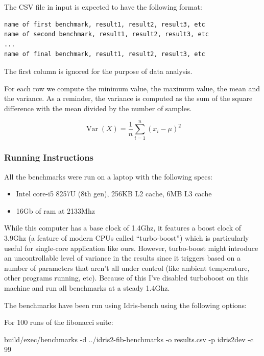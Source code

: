 \documentclass[
]{article}
\newenvironment{Shaded}{}{}
\newcommand{\DecValTok}[1]{\textcolor[rgb]{0.25,0.63,0.44}{#1}}
\newcommand{\NormalTok}[1]{#1}
\newcommand{\OperatorTok}[1]{\textcolor[rgb]{0.40,0.40,0.40}{#1}}
\providecommand{\tightlist}{%
  \setlength{\itemsep}{0pt}\setlength{\parskip}{0pt}}
\begin{document}
The CSV file in input is expected to have the following format:

\begin{verbatim}
name of first benchmark, result1, result2, result3, etc
name of second benchmark, result1, result2, result3, etc
...
name of final benchmark, result1, result2, result3, etc
\end{verbatim}

The first column is ignored for the purpose of data analysis.

For each row we compute the minimum value, the maximum value, the mean
and the variance. As a reminder, the variance is computed as the sum of
the square difference with the mean divided by the number of samples.

\[ \operatorname{Var}(X) = \frac{1}{n} \sum_{i=1}^n (x_i - \mu)^2 \]

\hypertarget{running-instructions}{%
\subsubsection{Running Instructions}\label{running-instructions}}

All the benchmarks were run on a laptop with the following specs:

\begin{itemize}
\tightlist
\item
  Intel core-i5 8257U (8th gen), 256KB L2 cache, 6MB L3 cache
\item
  16Gb of ram at 2133Mhz
\end{itemize}

While this computer has a base clock of 1.4Ghz, it features a boost
clock of 3.9Ghz (a feature of modern CPUs called ``turbo-boost'') which
is particularly useful for single-core application like ours. However,
turbo-boost might introduce an uncontrollable level of variance in the
results since it triggers based on a number of parameters that aren't
all under control (like ambient temperature, other programs running,
etc). Because of this I've disabled turboboost on this machine and run
all benchmarks at a steady 1.4Ghz.

The benchmarks have been run using Idris-bench using the following
options:

For 100 runs of the fibonacci suite:

\begin{Shaded}
\begin{Highlighting}[]
\NormalTok{build}\OperatorTok{/}\NormalTok{exec}\OperatorTok{/}\NormalTok{benchmarks }\OperatorTok{{-}}\NormalTok{d }\OperatorTok{../}\NormalTok{idris2}\OperatorTok{{-}}\NormalTok{fib}\OperatorTok{{-}}\NormalTok{benchmarks }
                      \OperatorTok{{-}}\NormalTok{o results}\OperatorTok{.}\NormalTok{csv }
                      \OperatorTok{{-}}\NormalTok{p idris2dev }
                      \OperatorTok{{-}}\NormalTok{c }\DecValTok{99}
\end{Highlighting}
\end{Shaded}
\end{document}
